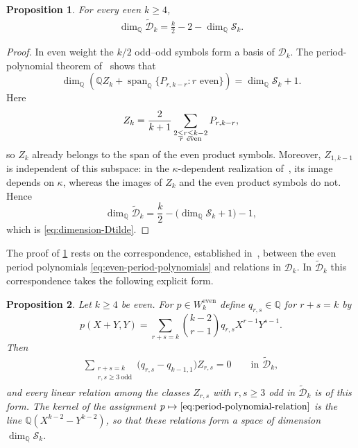 \documentclass[12pt]{amsart}
\numberwithin{equation}{section}
\theoremstyle{plain}
\newtheorem{prop}[prop]{Proposition}
\newcommand{\odd}{\mathrm{odd}}
\newcommand{\even}{\mathrm{even}}
\newcommand{\QQ}{\mathbb{Q}}
\DeclareMathOperator{\Span}{span}
\newcommand{\Dk}{\mathcal D_k}
\newcommand{\Dtk}{\widetilde{\mathcal D}_k}
\begin{document}
\begin{prop}\label{prop:dimension-Dtilde}
For every even $k\geq4$,
\begin{align}\label{eq:dimension-Dtilde}
 \dim_{\QQ}\Dtk=\frac{k}{2}-2-\dim_{\QQ}\mathcal S_k.
\end{align}
\end{prop}

\begin{proof}
In even weight the $k/2$ odd--odd symbols form a basis of $\Dk$.
The period-polynomial theorem of~\cite{GKZ} shows that
\[
 \dim_{\QQ}\left(\QQ Z_k+
 \Span_{\QQ}\{P_{r,k-r}:r\text{ even}\}\right)
 =\dim_{\QQ}\mathcal S_k+1.
\]
Here
\[
 Z_k=\frac{2}{k+1}
 \sum_{\substack{2\leq r\leq k-2\\r\ {\rm even}}}P_{r,k-r},
\]
so $Z_k$ already belongs to the span of the even product symbols.
Moreover, $Z_{1,k-1}$ is independent of this subspace: in the
$\kappa$-dependent realization of~\cite[(24)]{GKZ}, its image depends on
$\kappa$, whereas the images of $Z_k$ and the even product symbols do
not. Hence
\[
 \dim_{\QQ}\Dtk=\frac{k}{2}
 -\bigl(\dim_{\QQ}\mathcal S_k+1\bigr)-1,
\]
which is \eqref{eq:dimension-Dtilde}.
\end{proof}

The proof of \cref{prop:dimension-Dtilde} rests on the correspondence,
established in~\cite{GKZ}, between the even period polynomials
\eqref{eq:even-period-polynomials} and relations in $\Dk$. In $\Dtk$
this correspondence takes the following explicit form.

\begin{prop}\label{prop:period-polynomial-relations}
Let $k\geq4$ be even. For $p\in W_k^{\even}$ define $q_{r,s}\in\QQ$ for
$r+s=k$ by
\[
 p(X+Y,Y)=\sum_{r+s=k}\binom{k-2}{r-1}q_{r,s}X^{r-1}Y^{s-1}.
\]
Then
\begin{align}\label{eq:period-polynomial-relation}
 \sum_{\substack{r+s=k\\r,s\geq3\ \odd}}
 \bigl(q_{r,s}-q_{k-1,1}\bigr)Z_{r,s}=0
 \qquad\text{in }\Dtk,
\end{align}
and every linear relation among the classes $Z_{r,s}$ with $r,s\geq3$
odd in $\Dtk$ is of this form. The kernel of the assignment
$p\mapsto\eqref{eq:period-polynomial-relation}$ is the line
$\QQ(X^{k-2}-Y^{k-2})$, so that these relations form a space of
dimension $\dim_{\QQ}\mathcal S_k$.
\end{prop}
\end{document}
